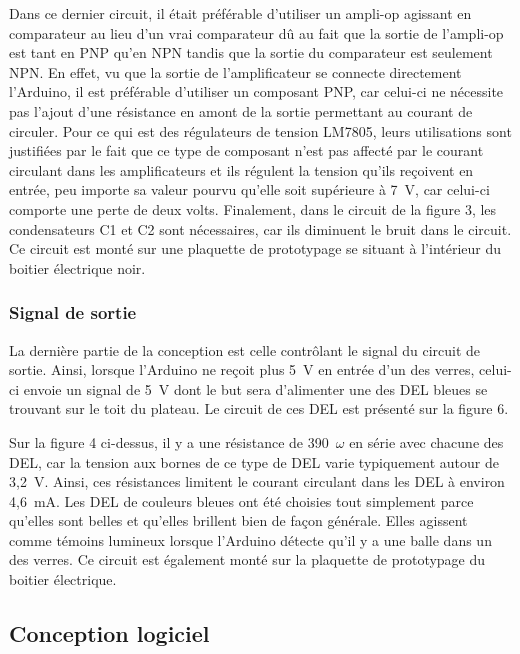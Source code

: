 Dans ce dernier circuit, il était préférable d’utiliser un ampli-op agissant en comparateur au lieu d’un vrai comparateur dû au fait que la sortie de l’ampli-op est tant en PNP qu'en NPN tandis que la sortie du comparateur est seulement NPN.
En effet, vu que la sortie de l’amplificateur se connecte directement l’Arduino, il est préférable d’utiliser un composant PNP, car celui-ci ne nécessite pas l’ajout d’une résistance en amont de la sortie permettant au courant de circuler.
Pour ce qui est des régulateurs de tension LM7805, leurs utilisations sont justifiées par le fait que ce type de composant n’est pas affecté par le courant circulant dans les amplificateurs et ils régulent la tension qu’ils reçoivent en entrée, peu importe sa valeur pourvu qu’elle soit supérieure à 7~V, car celui-ci comporte une perte de deux volts.
Finalement, dans le circuit de la figure 3, les condensateurs C1 et C2 sont nécessaires, car ils diminuent le bruit dans le circuit.
Ce circuit est monté sur une plaquette de prototypage se situant à l’intérieur du boitier électrique noir.

\subsubsection{Signal de sortie}

La dernière partie de la conception est celle contrôlant le signal du circuit de sortie.
Ainsi, lorsque l’Arduino ne reçoit plus 5~V en entrée d’un des verres, celui-ci envoie un signal de 5~V dont le but sera d’alimenter une des DEL bleues se trouvant sur le toit du plateau.
Le circuit de ces DEL est présenté sur la figure 6.


Sur la figure 4 ci-dessus, il y a une résistance de 390~$\omega$ en série avec chacune des DEL, car la tension aux bornes de ce type de DEL varie typiquement autour de 3,2~V.
Ainsi, ces résistances limitent le courant circulant dans les DEL à environ 4,6~mA.
Les DEL de couleurs bleues ont été choisies tout simplement parce qu’elles sont belles et qu’elles brillent bien de façon générale.
Elles agissent comme témoins lumineux lorsque l’Arduino détecte qu’il y a une balle dans un des verres.
Ce circuit est également monté sur la plaquette de prototypage du boitier électrique.

\subsection{Conception logiciel}

